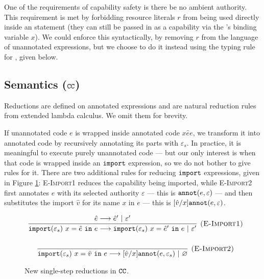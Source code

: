 One of the requirements of capability safety is there be no ambient
authority.  This requirement is met by forbidding resource literals
$r$ from being used directly inside an  statement (they
can still be passed in as a capability via the 's binding
variable $x$).  We could enforce this syntactically, by removing $r$
from the language of unannotated expressions, but we choose to do it
instead using the typing rule for , given below.

\subsection{Semantics ($\mathtt{CC}$)}

Reductions are defined on annotated expressions and are natural
reduction rules from extended lambda calculus. We omit them for
brevity.

If unannotated code $e$ is wrapped inside annotated code
${x}{\hat e}{e}$, we transform it into annotated
code by recursively annotating its parts with $\varepsilon_s$. In
practice, it is meaningful to execute purely unannotated code --- but
our only interest is when that code is wrapped inside an
$\mathtt{import}$ expression, so we do not bother to give rules for
it. There are two additional rules for reducing $\mathtt{import}$
expressions, given in Figure \ref{fig:epscalc_reductions}:
\textsc{E-Import1} reduces the capability being imported, while
\textsc{E-Import2} first annotates $e$ with its selected authority
$\varepsilon$ --- this is $\mathtt{annot}(e, \varepsilon)$ --- and then
substitutes the import $\hat v$ for its name $x$ in $e$ --- this is
$[\hat v/x]\mathtt{annot}(e, \varepsilon)$.

\begin{figure}[h]


\[
\begin{array}{c}
\infer[\textsc{(E-Import1)}]
	{\kwa{import}(\varepsilon_s)~x = \hat e~\kw{in} e \longrightarrow \kwa{import}(\varepsilon_s)~x = \hat e'~\kw{in} e~|~\varepsilon'}
	{\hat e \longrightarrow \hat e'~|~\varepsilon'}\\[4ex]

\infer[\textsc{(E-Import2)}]
	{\kwa{import}(\varepsilon_s)~x = \hat v~\kw{in} e \longrightarrow [\hat v/x]\kwa{annot}(e, \varepsilon_s)~|~\varnothing}
	{}

\end{array}
\]
\caption{New single-step reductions in $\mathtt{CC}$.}
\label{fig:epscalc_reductions}
\end{figure}

